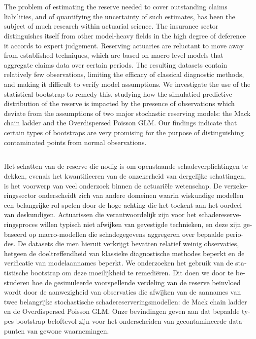 \documentclass[a4paper]{book}
\begin{document}
\chapter{\abstractname}
The problem of estimating the reserve needed to cover outstanding claims liabilities, and of quantifying the uncertainty of such estimates, has been the subject of much research within actuarial science. The insurance sector distinguishes itself from other model-heavy fields in the high degree of deference it accords to expert judgement. Reserving actuaries are reluctant to move away from established techniques, which are based on macro-level models that aggregate claims data over certain periods. The resulting datasets contain relatively few observations, limiting the efficacy of classical diagnostic methods, and making it difficult to verify model assumptions. We investigate the use of the statistical bootstrap to remedy this, studying how the simulatied predictive distribution of the reserve is impacted by the presence of observations which deviate from the assumptions of two major stochastic reserving models: the Mack chain ladder and the Overdispersed Poisson GLM. Our findings indicate that certain types of bootstraps are very promising for the purpose of distinguishing contaminated points from normal observations.

\begin{otherlanguage}{dutch}
  \chapter{\abstractname}
  Het schatten van de reserve die nodig is om openstaande schadeverplichtingen te dekken, evenals het kwantificeren van de onzekerheid van dergelijke schattingen, is het voorwerp van veel onderzoek binnen de actuari\"ele wetenschap. De verzekeringssector onderscheidt zich van andere domeinen waarin wiskundige modellen een belangrijke rol spelen door de hoge achting die het toekent aan het oordeel van deskundigen. Actuarissen die verantwoordelijk zijn voor het schadereserveringsproces willen typisch niet afwijken van gevestigde technieken, en deze zijn gebaseerd op macro-modellen die schadegegevens aggregeren over bepaalde periodes. De datasets die men hieruit verkrijgt bevatten relatief weinig observaties, hetgeen de doeltreffendheid van klassieke diagnostische methodes beperkt en de verificatie van modelaannames beperkt. We onderzoeken het gebruik van de statistische bootstrap om deze moeilijkheid te remedi\"eren. Dit doen we door te bestuderen hoe de gesimuleerde voorspellende verdeling van de reserve be\"invloed wordt door de aanwezigheid van observaties die afwijken van de aannames van twee belangrijke stochastische schadereserveringsmodellen: de Mack chain ladder en de Overdispersed Poisson GLM. Onze bevindingen geven aan dat bepaalde types bootstrap beloftevol zijn voor het onderscheiden van gecontamineerde datapunten van gewone waarnemingen.
\end{otherlanguage}
\end{document}
